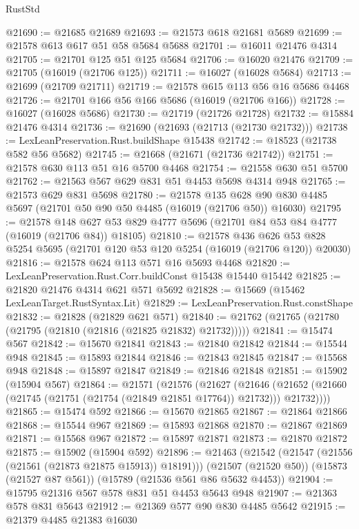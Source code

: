 \begin{lexlean}{RustStd}
\begin{coremodule}
@21690 := @21685 @21689
@21693 := @21573 @618 @21681 @5689
@21699 := @21578 @613 @617 @51 @58 @5684 @5688
@21701 := @16011 @21476 @4314
@21705 := @21701 @125 @51 @125 @5684
@21706 := @16020 @21476
@21709 := @21705 (@16019 (@21706 @125))
@21711 := @16027 (@16028 @5684)
@21713 := @21699 (@21709 @21711)
@21719 := @21578 @615 @113 @56 @16 @5686 @4468
@21726 := @21701 @166 @56 @166 @5686 (@16019 (@21706 @166))
@21728 := @16027 (@16028 @5686)
@21730 := @21719 (@21726 @21728)
@21732 := @15884 @21476 @4314
@21736 := @21690 (@21693 (@21713 (@21730 @21732)))
@21738 := LexLeanPreservation.Rust.buildShape @15438
@21742 := @18523 (@21738 @582 @56 @5682)
@21745 := @21668 (@21671 (@21736 @21742))
@21751 := @21578 @630 @113 @51 @16 @5700 @4468
@21754 := @21558 @630 @51 @5700
@21762 := @21563 @567 @629 @831 @51 @4453 @5698 @4314 @948
@21765 := @21573 @629 @831 @5698
@21780 := @21578
    @135
    @628
    @90
    @830
    @4485
    @5697
    (@21701 @50 @90 @50 @4485 (@16019 (@21706 @50)) @16030)
@21795 := @21578
    @148
    @627
    @53
    @829
    @4777
    @5696
    (@21701 @84 @53 @84 @4777 (@16019 (@21706 @84)) @18105)
@21810 := @21578
    @436
    @626
    @53
    @828
    @5254
    @5695
    (@21701 @120 @53 @120 @5254 (@16019 (@21706 @120)) @20030)
@21816 := @21578 @624 @113 @571 @16 @5693 @4468
@21820 := LexLeanPreservation.Rust.Corr.buildConst @15438 @15440 @15442
@21825 := @21820 @21476 @4314 @621 @571 @5692
@21828 := @15669 (@15462 LexLeanTarget.RustSyntax.Lit)
@21829 := LexLeanPreservation.Rust.constShape
@21832 := @21828 (@21829 @621 @571)
@21840 := @21762 (@21765 (@21780 (@21795 (@21810 (@21816 (@21825 @21832) @21732)))))
@21841 := @15474 @567
@21842 := @15670 @21841
@21843 := @21840 @21842
@21844 := @15544 @948
@21845 := @15893 @21844
@21846 := @21843 @21845
@21847 := @15568 @948
@21848 := @15897 @21847
@21849 := @21846 @21848
@21851 := @15902 (@15904 @567)
@21864 := @21571
    (@21576
      (@21627
        (@21646 (@21652 (@21660 (@21745 (@21751 (@21754 (@21849 @21851 @17764)) @21732))) @21732))))
@21865 := @15474 @592
@21866 := @15670 @21865
@21867 := @21864 @21866
@21868 := @15544 @967
@21869 := @15893 @21868
@21870 := @21867 @21869
@21871 := @15568 @967
@21872 := @15897 @21871
@21873 := @21870 @21872
@21875 := @15902 (@15904 @592)
@21896 := @21463
    (@21542 (@21547 (@21556 (@21561 (@21873 @21875 @15913)) @18191)))
    (@21507 (@21520 @50))
    (@15873 (@21527 @87 @561))
    (@15789 (@21536 @561 @86 @5632 @4453))
@21904 := @15795 @21316 @567 @578 @831 @51 @4453 @5643 @948
@21907 := @21363 @578 @831 @5643
@21912 := @21369 @577 @90 @830 @4485 @5642
@21915 := @21379 @4485 @21383 @16030

\end{coremodule}
\end{lexlean}
